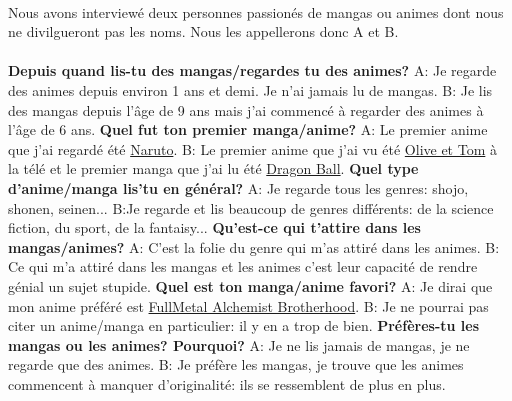 \paragraph{}
Nous avons interviewé deux personnes passionés de mangas ou animes dont nous ne divilgueront pas les noms. Nous les appellerons donc A et B.\\
\\
\textbf{Depuis quand lis-tu des mangas/regardes tu des animes?}\newline
A: Je regarde des animes depuis environ 1 ans et demi. Je n'ai jamais lu de mangas.
	\newline
B: Je lis des mangas depuis l'âge de 9 ans mais j'ai commencé à regarder des animes à l'âge de 6 ans.
	\newline
\textbf{Quel fut ton premier manga/anime?}
\newline
A: Le premier anime que j'ai regardé été \underline{Naruto}.
\newline
B: Le premier anime que j'ai vu été \underline{Olive et Tom} à la télé et le premier manga que j'ai lu été \underline{Dragon Ball}.
\newline
\textbf{Quel type d'anime/manga lis'tu en général?}
\newline
A: Je regarde tous les genres: shojo, shonen, seinen...
\newline
B:Je regarde et lis beaucoup de genres différents: de la science fiction, du sport, de la fantaisy...
\newline
\textbf{Qu'est-ce qui t'attire dans les mangas/animes?}
\newline
A: C'est la folie du genre qui m'as attiré dans les animes.
\newline
B: Ce qui m'a attiré dans les mangas et les animes c'est leur capacité de rendre génial un sujet stupide.
\newline
\textbf{Quel est ton manga/anime favori?}
\newline
A: Je dirai que mon anime préféré est \underline{FullMetal Alchemist Brotherhood}.
\newline
B: Je ne pourrai pas citer un anime/manga en particulier: il y en a trop de bien.
\newline
\textbf{Préfères-tu les mangas ou les animes? Pourquoi?}
\newline
A: Je ne lis jamais de mangas, je ne regarde que des animes.
\newline
B: Je préfère les mangas, je trouve que les animes commencent à manquer d'originalité: ils se ressemblent de plus en plus.
\newline
